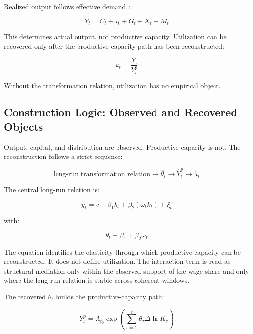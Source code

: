 Realized output follows effective demand \citep{Keynes1936}:

\begin{equation}
Y_t = C_t + I_t + G_t + X_t - M_t
\end{equation}

This determines actual output, not productive capacity. Utilization can be recovered only after the productive-capacity path has been reconstructed:

\begin{equation}
u_t = \frac{Y_t}{Y_t^p}
\end{equation}

Without the transformation relation, utilization has no empirical object.


\subsection{Construction Logic: Observed and Recovered Objects}

Output, capital, and distribution are observed. Productive capacity is not. The reconstruction follows a strict sequence:

\begin{equation}
\text{long-run transformation relation}
\rightarrow
\hat{\theta}_t
\rightarrow
\hat{Y}_t^p
\rightarrow
\hat{u}_t
\end{equation}

The central long-run relation is:

\begin{equation}
y_t
=
c
+
\beta_1 k_t
+
\beta_2(\omega_t k_t)
+
\xi_t
\end{equation}

with:

\begin{equation}
\theta_t=\beta_1+\beta_2\omega_t
\end{equation}

The equation identifies the elasticity through which productive capacity can be reconstructed. It does not define utilization. The interaction term is read as structural mediation only within the observed support of the wage share and only where the long-run relation is stable across coherent windows.

The recovered $\theta_t$ builds the productive-capacity path:

\begin{equation}
Y_t^p
=
A_{t_0}
\exp\left(
\sum_{\tau=t_0}^{t}
\theta_{\tau} \Delta \ln K_{\tau}
\right)
\end{equation}

